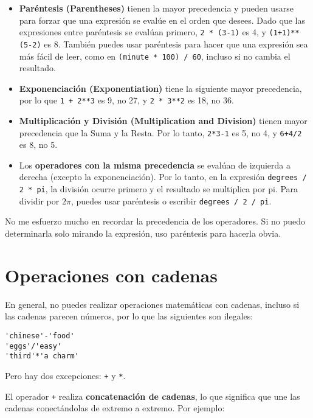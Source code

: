 \documentclass[12pt,letterpaper]{book}
\begin{document}
\begin{itemize}
\item \textbf{Paréntesis (Parentheses)} tienen la mayor precedencia y pueden usarse para forzar que una expresión se evalúe en el orden que desees. Dado que las expresiones entre paréntesis se evalúan primero, \texttt{2 * (3-1)} es 4, y \texttt{(1+1)**(5-2)} es 8. También puedes usar paréntesis para hacer que una expresión sea más fácil de leer, como en \texttt{(minute * 100) / 60}, incluso si no cambia el resultado.

\item \textbf{Exponenciación (Exponentiation)} tiene la siguiente mayor precedencia, por lo que \texttt{1 + 2**3} es 9, no 27, y \texttt{2 * 3**2} es 18, no 36.

\item \textbf{Multiplicación y División (Multiplication and Division)} tienen mayor precedencia que la Suma y la Resta. Por lo tanto, \texttt{2*3-1} es 5, no 4, y \texttt{6+4/2} es 8, no 5.

\item Los \textbf{operadores con la misma precedencia} se evalúan de izquierda a derecha (excepto la exponenciación). Por lo tanto, en la expresión \texttt{degrees / 2 * pi}, la división ocurre primero y el resultado se multiplica por pi. Para dividir por $2\pi$, puedes usar paréntesis o escribir \texttt{degrees / 2 / pi}.
\end{itemize}

No me esfuerzo mucho en recordar la precedencia de los operadores. Si no puedo determinarla solo mirando la expresión, uso paréntesis para hacerla obvia.

\section{Operaciones con cadenas}

En general, no puedes realizar operaciones matemáticas con cadenas, incluso si las cadenas parecen números, por lo que las siguientes son ilegales:

\begin{lstlisting}
'chinese'-'food'
'eggs'/'easy'
'third'*'a charm'
\end{lstlisting}

Pero hay dos excepciones: \texttt{+} y \texttt{*}.

El operador \texttt{+} realiza \textbf{concatenación de cadenas}, lo que significa que une las cadenas conectándolas de extremo a extremo. Por ejemplo:
\end{document}
